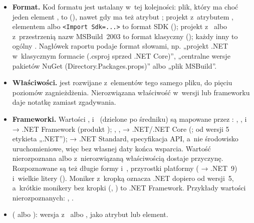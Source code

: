 \begin{itemize}
  \item \textbf{Format.} Kod formatu jest ustalany w~tej kolejności: plik, który ma choć
        jeden element , to 
        (), nawet gdy ma też atrybut ; projekt z~atrybutem
        , elementem  albo \texttt{<Import Sdk=...>} to format SDK
        (); projekt z~ albo z~przestrzenią
        nazw MSBuild~2003 to format klasyczny (); każdy inny
         to ogólny . Nagłówek raportu podaje format
        słowami, np. „projekt .NET w~klasycznym formacie (.csproj sprzed .NET Core)”,
        „centralne wersje pakietów NuGet (Directory.Packages.props)” albo „plik MSBuild”.
  \item \textbf{Właściwości.}  jest rozwijane z~elementów
         tego samego pliku, do pięciu poziomów zagnieżdżenia.
        Nierozwiązana właściwość w~wersji lub frameworku daje notatkę zamiast zgadywania.
  \item \textbf{Frameworki.} Wartości ,
         i~ (dzielone po średniku) są
        mapowane przez : , ,
         i~ → .NET Framework (produkt
        ); , ,
         → .NET/.NET Core (; od wersji 5 etykieta
        „.NET”);  → .NET Standard, specyfikacja API, a~nie środowisko
        uruchomieniowe, więc bez własnej daty końca wsparcia. Wartość nierozpoznana albo
        z~nierozwiązaną właściwością dostaje przyczynę. Rozpoznawane są też długie formy
         i~, przyrostki
        platformy ( → .NET~9) i~wielkie litery
        (). Moniker  z~kropką oznacza .NET dopiero od
        wersji~5, a~krótkie monikery bez kropki (, ) to .NET
        Framework. Przykłady wartości nierozpoznanych: , .
  \item \textbf{} ( albo ):
        wersja z~ albo , jako atrybut lub element.

\end{itemize}

